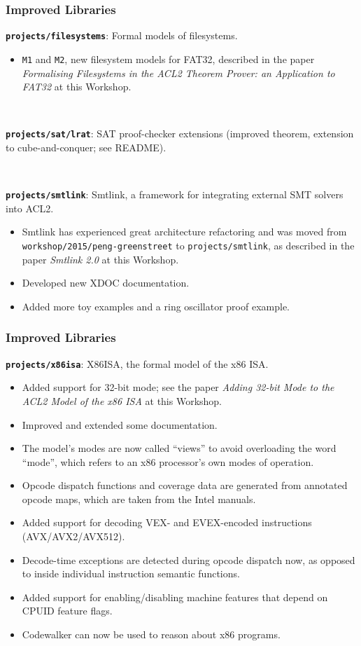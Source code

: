 \documentclass{beamer}
\newcommand{\code}[1]{\texttt{#1}}
\newcommand{\bookpath}[1]{\textbf{\code{#1}}}
\newcommand{\implibtitle}{\frametitle{Improved Libraries}}
\begin{document}
\begin{frame}

\implibtitle

\bookpath{projects/filesystems}:
Formal models of filesystems.
\begin{itemize}
\item
\texttt{M1} and \texttt{M2}, new filesystem models for FAT32,
described in the paper
\textit{Formalising Filesystems in the ACL2 Theorem Prover:
an Application to FAT32}
at this Workshop.
\end{itemize}

\

\bookpath{projects/sat/lrat}:
SAT proof-checker extensions (improved theorem, extension to
cube-and-conquer; see README).

\

\bookpath{projects/smtlink}:
Smtlink, a framework for integrating external SMT solvers into ACL2.
\begin{itemize}
\item
Smtlink has experienced great architecture refactoring and was moved from
\code{workshop/2015/peng-greenstreet} to \code{projects/smtlink},
as described in the paper \textit{Smtlink 2.0} at this Workshop.
\item
Developed new XDOC documentation.
\item
Added more toy examples and a ring oscillator proof example.
\end{itemize}

\end{frame}


\begin{frame}

\implibtitle

{\small
\bookpath{projects/x86isa}:
X86ISA, the formal model of the x86 ISA.
\begin{itemize}
\item
Added support for 32-bit mode; see the paper
\textit{Adding 32-bit Mode to the ACL2 Model of the x86 ISA}
at this Workshop.
\item
Improved and extended some documentation.
\item
The model's modes are now called ``views'' to avoid overloading the
word ``mode'', which refers to an x86 processor's own modes of
operation.
\item
Opcode dispatch functions and coverage data are generated from
annotated opcode maps, which are taken from the Intel manuals.
\item
Added support for decoding VEX- and EVEX-encoded instructions
(AVX/AVX2/AVX512).
\item
Decode-time exceptions are detected during opcode dispatch now, as
opposed to inside individual instruction semantic functions.
\item
Added support for enabling/disabling machine features that depend on
CPUID feature flags.
\item
Codewalker can now be used to reason about x86 programs.
\end{itemize}
}

\end{frame}
\end{document}
